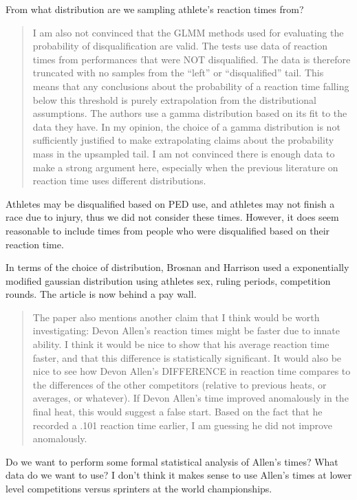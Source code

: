 \documentclass[12pt]{article}
\newenvironment{comment}%
{\begin{quotation}\noindent\small\it\color{darkblue}\ignorespaces%
}{\end{quotation}}
\begin{document}
From what distribution are we sampling athlete's reaction times from?


\begin{comment}
I am also not convinced that the GLMM methods used for evaluating the
probability of disqualification are valid. The tests use data of reaction times
from performances that were NOT disqualified.  The data is therefore truncated
with no samples from the “left” or “disqualified” tail. This means that any
conclusions about the probability of a reaction time falling below this
threshold is purely extrapolation from the distributional assumptions. The
authors use a gamma distribution based on its fit to the data they have. In my
opinion, the choice of a gamma distribution is not sufficiently justified to
make extrapolating claims about the probability mass in the upsampled tail. I am
not convinced there is enough data to make a strong argument here, especially
when the previous literature on reaction time uses different distributions.
\end{comment}
Athletes may be disqualified based on PED use, and athletes may not finish a race
due to injury, thus we did not consider these times.  However, it does seem
reasonable to include times from people who were disqualified based on their
reaction time.

In terms of the choice of distribution, Brosnan and Harrison used a exponentially
modified gaussian distribution using athletes sex, ruling periods, competition
rounds. The article is now behind a pay wall.


\begin{comment}
The paper also mentions another claim that I think would be worth investigating:
Devon Allen’s reaction times might be faster due to innate ability. I think it
would be nice to show that his average reaction time faster, and that this
difference is statistically significant. It would also be nice to see how Devon
Allen’s DIFFERENCE in reaction time compares to the differences of the other
competitors (relative to previous heats, or averages, or whatever). If Devon
Allen’s time improved anomalously in the final heat, this would suggest a false
start. Based on the fact that he recorded a .101 reaction time earlier, I am
guessing he did not improve anomalously.  
\end{comment}

Do we want to perform some formal statistical analysis of Allen's times? What
data do we want to use? I don't think it makes sense to use Allen's times at
lower level competitions versus sprinters at the world championships.
\end{document}
